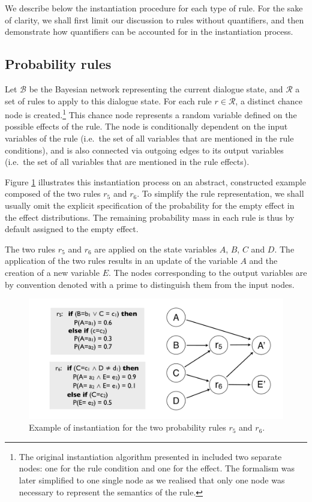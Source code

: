 We describe below the instantiation procedure for each type of rule. For the sake of clarity, we shall first limit our discussion to rules without quantifiers, and then demonstrate how quantifiers can be accounted for in the instantiation process. 

\subsection{Probability rules}
\label{sec:probruleinstantiation}

Let $\mathcal{B}$ be the Bayesian network representing the current dialogue state, and $\mathcal{R}$ a set of rules to apply to this dialogue state.  For each rule $r \in \mathcal{R}$, a distinct chance node is created.\footnote{The original instantiation algorithm presented in \citep{rulebasedmodels-sigdial2012} included two separate nodes: one for the rule condition and one for the effect.  The formalism was later simplified to one single node as we realised that only one node was necessary to represent the semantics of the rule.} This chance node represents a random variable defined on the possible effects of the rule.  The node is conditionally dependent on the input variables of the rule (i.e.\ the set of all variables that are mentioned in the rule conditions), and is also connected via outgoing edges to its output variables (i.e.\ the set of all variables that are mentioned in the rule effects). 

Figure \ref{fig:instantiationprob} illustrates this instantiation process on an abstract, constructed example composed of the two rules $r_5$ and $r_6$.  To simplify the rule representation, we shall usually omit the explicit specification of the probability for the empty effect in the effect distributions.  The remaining probability mass in each rule is thus by default assigned to the empty effect.

The two rules $r_5$ and $r_6$ are applied on the state variables $A$, $B$, $C$ and $D$.  The application of the two rules results in an update of the variable $A$ and the creation of a new variable $E$. The nodes corresponding to the output variables are by convention denoted with a prime to distinguish them from the input nodes.  

\begin{figure}[h]
\centering
\includegraphics[scale=0.25]{imgs/ruleinstantiation.pdf}
\caption{Example of instantiation for the two probability rules $r_5$ and $r_6$. }
\label{fig:instantiationprob}
\end{figure}

